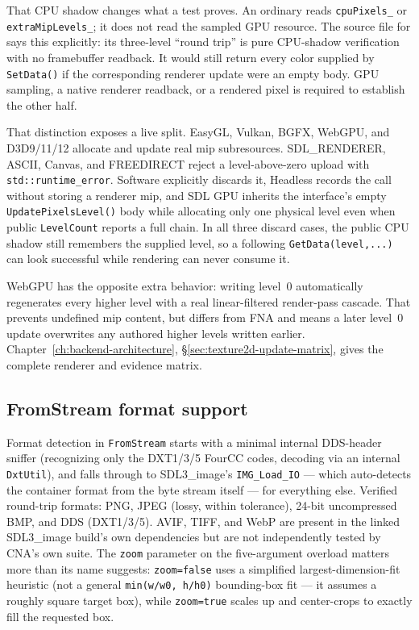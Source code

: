 That CPU shadow changes what a test proves. An ordinary  reads
\texttt{cpuPixels\_} or \texttt{extraMipLevels\_}; it does not read the sampled GPU resource.
The source file for  says this explicitly: its three-level
``round trip'' is pure CPU-shadow verification with no framebuffer readback. It would still
return every color supplied by \texttt{SetData()} if the corresponding renderer update were
an empty body. GPU sampling, a native renderer readback, or a rendered pixel is required to
establish the other half.

That distinction exposes a live split. EasyGL, Vulkan, BGFX, WebGPU, and D3D9/11/12 allocate
and update real  mip subresources. SDL\_RENDERER, ASCII, Canvas, and FREEDIRECT
reject a level-above-zero upload with \texttt{std::runtime\_error}. Software explicitly
discards it, Headless records the call without storing a renderer mip, and SDL GPU inherits
the interface's empty \texttt{UpdatePixelsLevel()} body while allocating only one physical
level even when public \texttt{LevelCount} reports a full chain. In all three discard cases,
the public CPU shadow still remembers the supplied level, so a following
\texttt{GetData(level,...)} can look successful while rendering can never consume it.

WebGPU has the opposite extra behavior: writing level~0 automatically regenerates every
higher level with a real linear-filtered render-pass cascade. That prevents undefined mip
content, but differs from FNA and means a later level~0 update overwrites any authored
higher levels written earlier. Chapter~\ref{ch:backend-architecture},
\S\ref{sec:texture2d-update-matrix}, gives the complete renderer and evidence matrix.

\subsection{FromStream format support}
\label{sec:texture-streams}

Format detection in \texttt{FromStream} starts with a minimal internal DDS-header sniffer
(recognizing only the DXT1/3/5 FourCC codes, decoding via an internal \texttt{DxtUtil}), and
falls through to SDL3\_image's \texttt{IMG\_Load\_IO} --- which auto-detects the container
format from the byte stream itself --- for everything else. Verified round-trip formats:
PNG, JPEG (lossy, within tolerance), 24-bit uncompressed BMP, and DDS (DXT1/3/5). AVIF, TIFF,
and WebP are present in the linked SDL3\_image build's own dependencies but are not
independently tested by CNA's own suite. The \texttt{zoom} parameter on the five-argument
overload matters more than its name suggests: \texttt{zoom=false} uses a simplified
largest-dimension-fit heuristic (not a general \texttt{min(w/w0, h/h0)} bounding-box fit --- it
assumes a roughly square target box), while \texttt{zoom=true} scales up and center-crops to
exactly fill the requested box.

